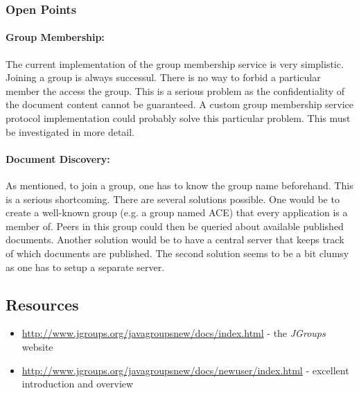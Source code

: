 \subsubsection{Open Points}
\paragraph{Group Membership:} The current implementation of the group membership service is very simplistic. Joining a group is always successul. There is no way to forbid a particular member the access the group. This is a serious problem as the confidentiality of the document content cannot be guaranteed. A custom group membership service protocol implementation could probably solve this particular problem. This must be investigated in more detail.

\paragraph{Document Discovery:} As mentioned, to join a group, one has to know the group name beforehand. This is a serious shortcoming. There are several solutions possible. One would be to create a well-known group (e.g. a group named ACE) that every application is a member of. Peers in this group could then be queried about available published documents. Another solution would be to have a central server that keeps track of which documents are published. The second solution seems to be a bit clumsy as one has to setup a separate server.


\subsection{Resources}
\begin{itemize}
 \item \url{http://www.jgroups.org/javagroupsnew/docs/index.html} - the \emph{JGroups} website
 \item \url{http://www.jgroups.org/javagroupsnew/docs/newuser/index.html} - excellent introduction and overview
\end{itemize}
